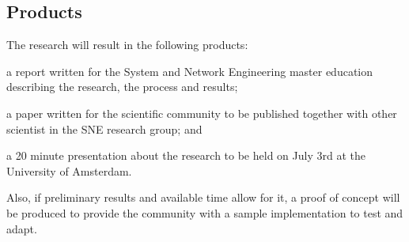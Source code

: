 \documentclass[oneside,twocolumn,8pt,a4paper]{article}
\begin{document}
		\subsection*{Products} %
		\label{sub:products}
			The research will result in the following products: 
			\begin{inparaenum}
				\item a report written for the System and Network Engineering master education describing the research, the process and results;
				\item a paper written for the scientific community to be published together with other scientist in the SNE research group; and
				\item a 20 minute presentation about the research to be held on July 3rd at the University of Amsterdam.
			\end{inparaenum}
			Also, if preliminary results and available time allow for it, a proof of concept will be produced to provide the community with a sample implementation to test and adapt.
	
	
	
	
\end{document}
